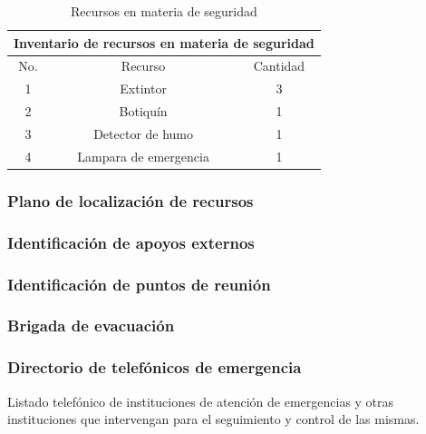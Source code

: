     \begin{table}[H]
        \centering
        \caption{Recursos en materia de seguridad}
        \begin{tabular}{c c c}
        \hline
        \multicolumn{3}{c}{Inventario de recursos en materia de seguridad}\\
        \hline
             No.& Recurso & Cantidad  \\
        \hline
             1& Extintor & 3  \\
        \hline
             2& Botiquín & 1  \\
        \hline
             3& Detector de humo & 1 \\
        \hline
             4& Lampara de emergencia & 1 \\
        \hline     
        \end{tabular}
        \label{tab:inventario}
    \end{table}
    \subsubsection{Plano de localización de recursos}
    
    
    \subsubsection{ Identificación de apoyos externos}
    
    \subsubsection{Identificación de puntos de reunión}
    
    
    \subsubsection{Brigada de evacuación}
    
    
    \subsubsection{Directorio de telefónicos de emergencia}
    
    Listado telefónico de instituciones de atención de emergencias y otras instituciones que intervengan para el seguimiento y control de las mismas.
    
